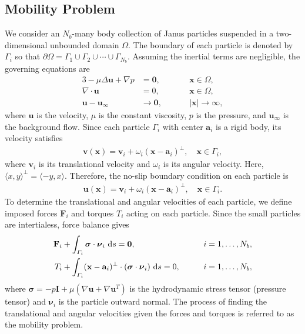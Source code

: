 \documentclass[lineno]{jfm}
\renewcommand{\aa}{\mathbf{a}}
\newcommand{\bd}{\partial}
\newcommand{\FF}{\mathbf{F}}
\newcommand{\nnu}{\boldsymbol{\nu}}
\newcommand{\ssigma}{\boldsymbol{\sigma}}
\newcommand{\xx}{\mathbf{x}}
\newcommand{\uu}{\mathbf{u}}
\renewcommand{\vv}{\mathbf{v}}
\begin{document}
\subsection{\label{mobility}Mobility Problem}
We consider an $N_b$-many body collection of Janus particles suspended
in a two-dimensional unbounded domain $\Omega$. The boundary of each
particle is denoted by $\Gamma_i$ so that $\bd \Omega = \Gamma_1 \cup
\Gamma_2 \cup \cdots \cup \Gamma_{N_b}$. Assuming the inertial terms are negligible, the
governing equations are
\begin{alignat}{3}
  -\mu \Delta \uu + \nabla p &= \mathbf{0}, 
    && \xx \in \Omega, \\
  \nabla\cdot \uu &= 0, \qquad && \xx \in \Omega, \\
  \uu - \uu_\infty &\to \mathbf{0}, && |\xx| \to \infty,
\end{alignat}
%
where $\uu$ is the velocity, $\mu$ is the constant viscosity, $p$ is the
pressure, and $\uu_\infty$ is the background flow. Since each particle
$\Gamma_i$ with center $\aa_i$ is a rigid body, its velocity satisfies 
\begin{align}
  \vv(\xx) = \vv_i + \omega_i (\xx - \aa_i)^\perp, \quad 
    \xx \in \Gamma_i,
\end{align}
where $\vv_i$ is its translational velocity and $\omega_i$ is its
angular velocity. Here, $\langle x, y \rangle^{\perp} = \langle -y, x
\rangle$. Therefore, the no-slip boundary condition on each particle is
\begin{align}
  \uu(\xx) = \vv_i + \omega_i (\xx - \aa_i)^\perp, \quad
    \xx \in \Gamma_i.
\end{align}
To determine the translational and angular velocities of each particle,
we define imposed forces $\FF_i$ and torques $T_i$ acting on each
particle. Since the small particles are intertialess, force balance
gives 
\begin{alignat}{2}
  \label{eq:force}
  \FF_i &+ \int_{\Gamma_i} \ssigma \cdot \nnu_i \, \dif s = \mathbf{0},
  && i=1,\ldots,N_b,\\
  \label{eq:torque}
  T_i &+ \int_{\Gamma_i} (\xx - \aa_i)^\perp \cdot 
    (\ssigma \cdot \nnu_i) \, \dif s = 0, \qquad && i=1,\ldots,N_b,
\end{alignat}
where $\ssigma = -p \mathbf{I} + \mu \left(\nabla \uu + \nabla \uu^T
\right)$ is the hydrodynamic stress tensor (pressure tensor) and
$\nnu_i$ is the particle outward normal. The process of finding the
translational and angular velocities given the forces and torques is
referred to as the mobility problem.
\end{document}
